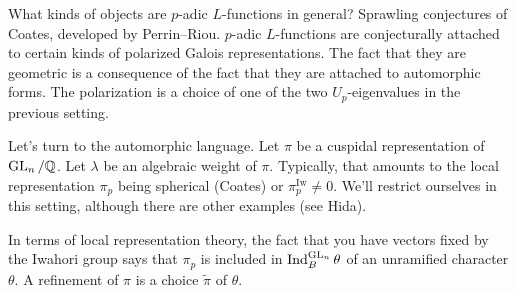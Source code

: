 \documentclass[reqno]{amsart} 
\begin{document}
What kinds of objects are $p$-adic $L$-functions in general?  Sprawling conjectures of Coates, developed by Perrin--Riou.  $p$-adic $L$-functions are conjecturally attached to certain kinds of polarized Galois representations.  The fact that they are geometric is a consequence of the fact that they are attached to automorphic forms.  The polarization is a choice of one of the two $U_p$-eigenvalues in the previous setting.

Let's turn to the automorphic language.  Let $\pi$ be a cuspidal representation of $\operatorname{GL}_n / \mathbb{Q}$.  Let $\lambda$ be an algebraic weight of $\pi$.  Typically, that amounts to the local representation $\pi_p$ being spherical (Coates) or $\pi_p^{\mathrm{Iw}} \neq 0$.  We'll restrict ourselves in this setting, although there are other examples (see Hida).

In terms of local representation theory, the fact that you have vectors fixed by the Iwahori group says that $\pi_p$ is included in $\operatorname{Ind}_B^{\operatorname{GL}_n} \theta$ of an unramified character $\theta$.  A refinement of $\pi$ is a choice $\tilde{\pi}$ of $\theta$.
\end{document}
